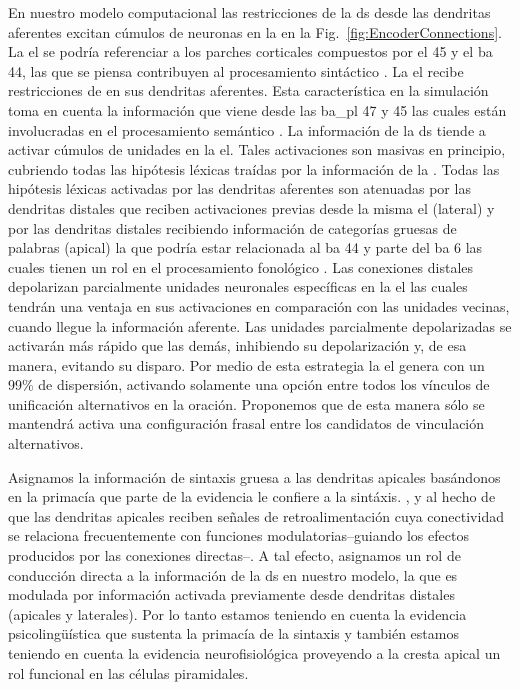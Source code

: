 {En nuestro modelo computacional las restricciones de la \gls{ds} desde las dendritas aferentes excitan cúmulos de neuronas en la  en la Fig.~\ref{fig:EncoderConnections}.
La \gls{el} se podría referenciar a los parches corticales compuestos por el  45 y el \gls{ba} 44, las que se piensa contribuyen al procesamiento sintáctico \cite{Pallier2522, doi:10.1152/physrev.00006.2011, doi:10.1146/annurev-neuro-071013-013847}.
La \gls{el} recibe restricciones de  en sus dendritas aferentes. Esta característica en la simulación toma en cuenta la información que viene desde las \gls{ba_pl} 47 y 45 las cuales están involucradas en el procesamiento semántico \cite{GOUCHA2015294, DECARLI2007933, PMID:15528098, NEWMAN201051}.
La información de la \gls{ds} tiende a activar cúmulos de unidades en la \gls{el}. Tales activaciones son masivas en principio, cubriendo todas las hipótesis léxicas traídas por la información de la . 
Todas las hipótesis léxicas activadas por las dendritas aferentes son atenuadas por las dendritas distales que reciben activaciones previas desde la misma \gls{el} (lateral) y por las dendritas distales recibiendo información de categorías gruesas de palabras (apical) la que podría estar relacionada al \gls{ba} 44 y parte del \gls{ba} 6 las cuales tienen un rol en el procesamiento fonológico \cite{Lee3942, PMID:27381836, HEIM2003285, PMID:18296070, AMUNTS200442}.
Las conexiones distales depolarizan parcialmente unidades neuronales específicas en la \gls{el} las cuales tendrán una ventaja en sus activaciones en comparación con las unidades vecinas, cuando llegue la información aferente.
Las unidades parcialmente depolarizadas se activarán más rápido que las demás, inhibiendo su depolarización y, de esa manera, evitando su disparo.
Por medio de esta estrategia la \gls{el} genera  con un 99\% de dispersión, activando solamente una opción entre todos los vínculos de unificación alternativos en la oración. Proponemos que de esta manera sólo se mantendrá activa una configuración frasal entre los candidatos de vinculación alternativos.

Asignamos la información de sintaxis gruesa a las dendritas apicales basándonos en la primacía que parte de la evidencia le confiere a la sintáxis.
\cite{BORNKESSELSCHLESEWSKY200855,doi:10.1111/j.1749-818X.2008.00099.x,FRIEDERICI200278,doi:10.1152/physrev.00006.2011}, y al hecho de que
las dendritas apicales reciben señales de retroalimentación \cite{Spruston2008PyramidalND} cuya conectividad se relaciona frecuentemente con funciones modulatorias--guiando los efectos producidos por las conexiones directas--\cite{news_hidden_2018, marques_functional_2018, Chen2009ForwardAB}.
A tal efecto, asignamos un rol de conducción directa a la información de la \gls{ds} en nuestro modelo, la que es modulada por información activada previamente desde dendritas distales (apicales y laterales).
Por lo tanto estamos teniendo en cuenta la evidencia psicolingüística que sustenta la primacía de la sintaxis y también estamos teniendo en cuenta la evidencia neurofisiológica proveyendo a la cresta apical un rol funcional en las células piramidales.


}
